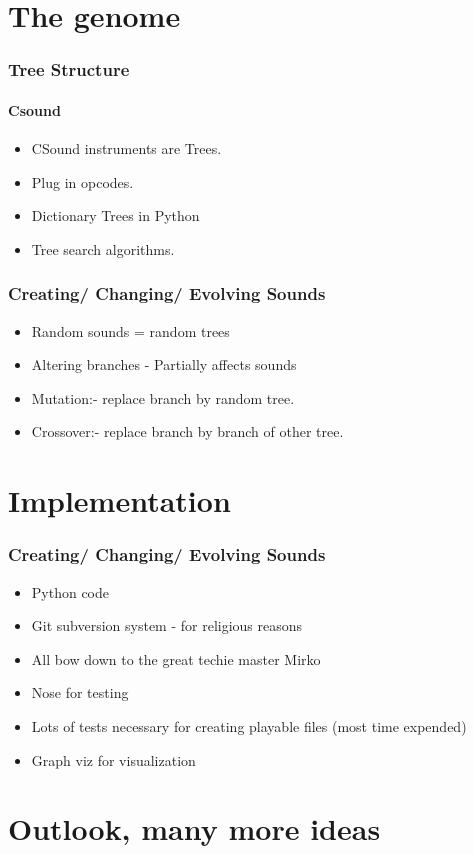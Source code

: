 \documentclass{beamer}
\begin{document}


\section{The genome} %
\begin{frame}
	\frametitle{Tree Structure}
	\framesubtitle{Csound}
	\begin{itemize}
	\item<1-> CSound instruments are Trees.
	\item<3-> Plug in opcodes.
	\item<4-> Dictionary Trees in Python
	\item<5-> Tree search algorithms.	
\end{itemize}

	
\end{frame}

\begin{frame}
	\frametitle{Creating/ Changing/ Evolving Sounds}
	\begin{itemize}
	\item<1-> Random sounds = random trees
	\item<2-> Altering branches - Partially affects sounds
	\item<3-> Mutation:- replace branch by random tree.
	\item<4-> Crossover:- replace branch by branch of other tree.		
\end{itemize}

\end{frame}

\label{sg:sec:the_genome}



\section{Implementation} %
\begin{frame}
	\frametitle{Creating/ Changing/ Evolving Sounds}
	\begin{itemize}
	\item<1-> Python code 
	\item<2-> Git subversion system - for religious reasons
	\item<3-> All bow down to the great techie master Mirko
	\item<4-> Nose for testing 
	\item<5-> Lots of tests necessary for creating playable files (most time expended)
	\item<6-> Graph viz for visualization
         \end{itemize}

\end{frame}


\label{sg:sec:imple}



\section{Outlook, many more ideas} %
\label{sg:sec:outlook_many_more_ideas}

\end{document}
